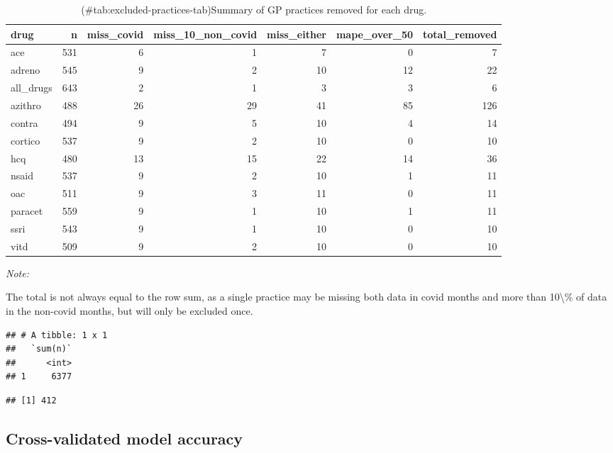 \begin{appendix}
\begin{table}
\caption{(\#tab:excluded-practices-tab)Summary of GP practices removed for each drug.}
\centering
\begin{threeparttable}
\begin{tabular}[t]{lrrrrrr}
\toprule
drug & n & miss\_covid & miss\_10\_non\_covid & miss\_either & mape\_over\_50 & total\_removed\\
\midrule
ace & 531 & 6 & 1 & 7 & 0 & 7\\
adreno & 545 & 9 & 2 & 10 & 12 & 22\\
all\_drugs & 643 & 2 & 1 & 3 & 3 & 6\\
azithro & 488 & 26 & 29 & 41 & 85 & 126\\
contra & 494 & 9 & 5 & 10 & 4 & 14\\
cortico & 537 & 9 & 2 & 10 & 0 & 10\\
hcq & 480 & 13 & 15 & 22 & 14 & 36\\
nsaid & 537 & 9 & 2 & 10 & 1 & 11\\
oac & 511 & 9 & 3 & 11 & 0 & 11\\
paracet & 559 & 9 & 1 & 10 & 1 & 11\\
ssri & 543 & 9 & 1 & 10 & 0 & 10\\
vitd & 509 & 9 & 2 & 10 & 0 & 10\\
\bottomrule
\end{tabular}
\begin{tablenotes}
\item \textit{Note: } 
\item The total is not always equal to the row sum, as a single practice may be missing both data in covid months and more than 10\textbackslash{}\% of data in the non-covid months, but will only be excluded once.
\end{tablenotes}
\end{threeparttable}
\end{table}

\begin{verbatim}
## # A tibble: 1 x 1
##   `sum(n)`
##      <int>
## 1     6377
\end{verbatim}

\begin{verbatim}
## [1] 412
\end{verbatim}

\hypertarget{cross-validated-model-accuracy}{%
\subsection{Cross-validated model
accuracy}\label{cross-validated-model-accuracy}}


\end{appendix}
